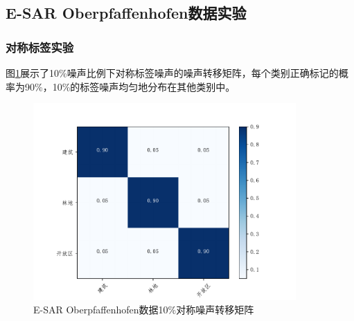 \subsection{E-SAR Oberpfaffenhofen数据实验}
\subsubsection{对称标签实验}
图\ref{fig:ober_noise_uniform}展示了10\%噪声比例下对称标签噪声的噪声转移矩阵，每个类别正确标记的概率为90\%，10\%的标签噪声均匀地分布在其他类别中。
\begin{figure}[ht!]
    \centering
    \includegraphics[width=10.04cm]{pic/chapter4/ober/noise_uniform.pdf}
    \caption{E-SAR Oberpfaffenhofen数据10\%对称噪声转移矩阵}
    \label{fig:ober_noise_uniform}
\end{figure}

